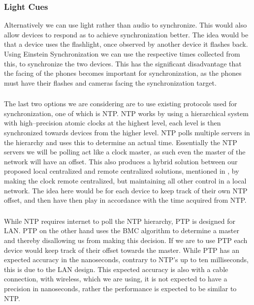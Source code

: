 \subsubsection{Light Cues}
Alternatively we can use light rather than audio to synchronize.
This would also allow devices to respond as to achieve synchronization better.
The idea would be that a device uses the flashlight, once observed by another device it flashes back.
Using Einstein Synchronization we can use the respective times collected from this, to synchronize the two devices.
This has the significant disadvantage that the facing of the phones becomes important for synchronization, as the phones must have their flashes and cameras facing the synchronization target.

\subsubsection{}
The last two options we are considering are to use existing protocols used for synchronization, one of which is \ac{NTP}.
\ac{NTP} works by using a hierarchical system with high--precision atomic clocks at the highest level, each level is then synchronized towards devices from the higher level.
\ac{NTP} polls multiple servers in the hierarchy and uses this to determine an actual time.
Essentially the \ac{NTP} servers we will be polling act like a clock master, as such even the master of the network will have an offset.
This also produces a hybrid solution between our proposed local centralized and remote centralized solutions, mentioned in , by making the clock remote centralized, but maintaining all other control in a local network.
The idea here would be for each device to keep track of their own \ac{NTP} offset, and then have then play in accordance with the time acquired from \ac{NTP}. 

\subsubsection{}
While \ac{NTP} requires internet to poll the \ac{NTP} hierarchy, \ac{PTP} is designed for LAN.
\ac{PTP} on the other hand uses the \ac{BMC} algorithm to determine a master and thereby disallowing us from making this decision.
If we are to use \ac{PTP} each device would keep track of their offset towards the master.
While \ac{PTP} has an expected accuracy in the nanoseconds, contrary to NTP's up to ten milliseconds, this is due to the LAN design.
This expected accuracy is also with a cable connection, with wireless, which we are using, it is not expected to have a precision in nanoseconds, rather the performance is expected to be similar to \ac{NTP}.

